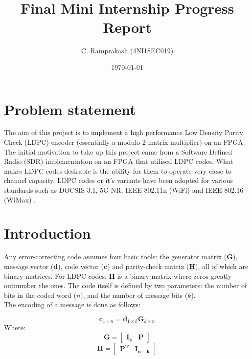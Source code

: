 \documentclass[a4paper,12pt]{article}
\begin{document}
\title{Final Mini Internship Progress Report}
\author{C. Ramprakash (4NI18EC019)}
\date{\today}
\maketitle

\section{Problem statement}
The aim of this project is to implement a high performance Low Density
Parity Check (LDPC) \cite{gallager1962} encoder (essentially a modulo-2 matrix
multiplier) on an FPGA. The initial motivation to take up this project came
from a Software Defined Radio (SDR) implementation on an FPGA \cite{lpsdr_isc}
that utilised LDPC codes. What makes LDPC codes desirable is the ability for
them to operate very close to channel capacity. LDPC codes or it's variants
have been adopted for various standards such as DOCSIS 3.1, 5G-NR, IEEE 802.11n (WiFi) and
IEEE 802.16 (WiMax) \cite{ldpcwebdemo}.

\section{Introduction}
Any error-correcting code assumes four basic tools: the generator matrix
($\boldsymbol{G}$), message vector
($\boldsymbol{d}$), code vector
($\boldsymbol{c}$) and parity-check matrix
($\boldsymbol{H}$), all of which are binary matrices. For
LDPC codes, \begin{math}\boldsymbol{H}\end{math} is a binary matrix where zeros
greatly outnumber the ones. The code itself is defined by two parameters: the
number of bits in the coded word ($n$), and the number of message bits ($k$).\\
The encoding of a message is done as follows:

\begin{equation}\label{eq:coding}
    \boldsymbol{c}_{1 \times n} = \boldsymbol{d}_{1 \times k}\boldsymbol{G}_{k \times n}
\end{equation}
Where:
\begin{equation}\label{eq:generator}
    \boldsymbol{G} = \left[\begin{array}{c|c}\boldsymbol{I_{k}}&\boldsymbol{P}\end{array}\right]
\end{equation}
\begin{equation}\label{eq:pcheck}
    \boldsymbol{H} = \left[\begin{array}{c|c}\boldsymbol{P^T}&\boldsymbol{I_{n-k}}\end{array}\right]
\end{equation}
\end{document}
